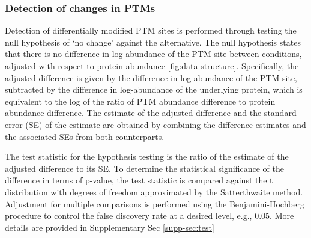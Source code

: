 \documentclass[mcp]{article}
\numberwithin{figure}{section} %
\numberwithin{table}{section}
\begin{document}
\subsubsection*{Detection of changes in PTMs}
\label{sec:adjustment_summary}

Detection of differentially modified PTM sites is performed through testing the null hypothesis of ‘no change’ against the alternative. The null hypothesis states that there is no difference in log-abundance of the PTM site between conditions, adjusted with respect to protein abundance \ref{fig:data-structure}. Specifically, the adjusted difference is given by the difference in log-abundance of the PTM site, subtracted by the difference in log-abundance of the underlying protein, which is equivalent to the log of the ratio of PTM abundance difference to protein abundance difference. The estimate of the adjusted difference and the standard error (SE) of the estimate are obtained by combining the difference estimates and the associated SEs from both counterparts.

The test statistic for the hypothesis testing is the ratio of the estimate of the adjusted difference to its SE. To determine the statistical significance of the difference in terms of p-value, the test statistic is compared against the t distribution with degrees of freedom approximated by the Satterthwaite method. \cite{satterthwaite:1946} Adjustment for multiple comparisons is performed using the Benjamini-Hochberg procedure to control the false discovery rate at a desired level, e.g., $0.05$.\cite{Benjamini:1995} More details are provided in Supplementary Sec \ref{supp-sec:test}

\end{document}
